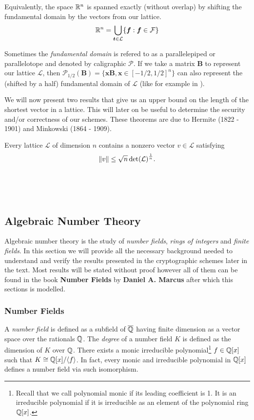 Equivalently, the space $\mathbb{R}^n$ is spanned exactly (without overlap) by shifting the fundamental domain by the vectors from our lattice.
$$ \mathbb{R}^n = \bigcup_{\boldsymbol{t} \in \mathcal{L}} \{\boldsymbol{f} : \boldsymbol{f} \in \mathcal{F} \}$$

\begin{remark}
    Sometimes the \textit{fundamental domain} is refered to as a parallelepiped or parallelotope and denoted by caligraphic $\mathcal{P}$. If we take a matrix $\bm{B}$ to represent our lattice $\mathcal{L}$, then $\mathcal{P}_{1/2}(\bm{B}) = \{\bm{x}\bm{B}, \bm{x} \in [-1/2, 1/2]^n \}$ can also represent the (shifted by a half) fundamental domain of $\mathcal{L}$ (like for example in \cite{gentry}).
\end{remark}

We will now present two results that give us an upper bound on the length of the shortest vector in a lattice. This will later on be useful to determine the security and/or correctness of our schemes. These theorems are due to Hermite (1822 - 1901) and Minkowski (1864 - 1909).

\begin{theorem}
    Every lattice $\mathcal{L}$ of dimension $n$ contains a nonzero vector $v \in \mathcal{L}$ satisfying
    $$ \norm{v} \leq \sqrt{n} \det(\mathcal{L})^{\frac{1}{n}}.$$
\end{theorem}
\\
\\
\\
\subsection{Algebraic Number Theory}

Algebraic number theory is the study of \textit{number fields}, \textit{rings of integers} and \textit{finite fields}. In this section we will provide all the necessary background needed to understand and verify the results presented in the cryptographic schemes later in the text. Most results will be stated without proof however all of them can be found in the book \textbf{Number Fields} by \textbf{Daniel A. Marcus} \cite{algebra} after which this sections is modelled.

\subsubsection*{Number Fields}
A \textit{number field} is defined as a subfield of $\overline{\mathbb{Q}}$ having finite dimension as a vector space over the rationals $\mathbb{Q}$. The \textit{degree} of a number field $K$ is defined as the dimension of $K$ over $\mathbb{Q}$. There exists a monic irreducible polynomial\footnote{Recall that we call polynomial monic if its leading coefficient is 1. It is an irreducible polynomial if it is irreducible as an element of the polynomial ring $\mathbb{Q}[x]$.} $f \in \mathbb{Q}[x]$ such that $K \cong \mathbb{Q}[x]/\langle f \rangle$. In fact, every monic and irreducible polynomial in $\mathbb{Q}[x]$ defines a number field via such isomorphism.

